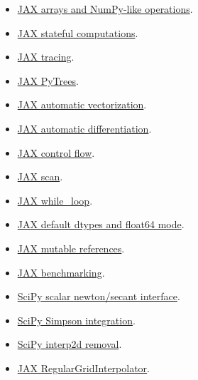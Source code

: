 \documentclass[11pt,a4paper]{article}
\begin{document}
\begin{itemize}
\item \href{https://docs.jax.dev/en/latest/101/arrays.html}{JAX arrays and NumPy-like operations}.


\item \href{https://docs.jax.dev/en/latest/stateful-computations.html}{JAX stateful computations}.


\item \href{https://docs.jax.dev/en/latest/tracing.html}{JAX tracing}.


\item \href{https://docs.jax.dev/en/latest/pytrees.html}{JAX PyTrees}.


\item \href{https://docs.jax.dev/en/latest/automatic-vectorization.html}{JAX automatic vectorization}.


\item \href{https://docs.jax.dev/en/latest/automatic-differentiation.html}{JAX automatic differentiation}.


\item \href{https://docs.jax.dev/en/latest/control-flow.html}{JAX control flow}.


\item \href{https://docs.jax.dev/en/latest/_autosummary/jax.lax.scan.html}{JAX scan}.


\item \href{https://docs.jax.dev/en/latest/_autosummary/jax.lax.while_loop.html}{JAX while\_loop}.


\item \href{https://docs.jax.dev/en/latest/101/default_dtypes.html}{JAX default dtypes and float64 mode}.


\item \href{https://docs.jax.dev/en/latest/array_refs.html}{JAX mutable references}.


\item \href{https://docs.jax.dev/en/latest/benchmarking.html}{JAX benchmarking}.


\item \href{https://docs.scipy.org/doc/scipy/reference/generated/scipy.optimize.newton.html}{SciPy scalar newton/secant interface}.


\item \href{https://docs.scipy.org/doc/scipy/reference/generated/scipy.integrate.simpson.html}{SciPy Simpson integration}.


\item \href{https://docs.scipy.org/doc/scipy/reference/generated/scipy.interpolate.interp2d.html}{SciPy interp2d removal}.


\item \href{https://docs.jax.dev/en/latest/_autosummary/jax.scipy.interpolate.RegularGridInterpolator.html}{JAX RegularGridInterpolator}.


\end{itemize}
\clearpage
\end{document}
